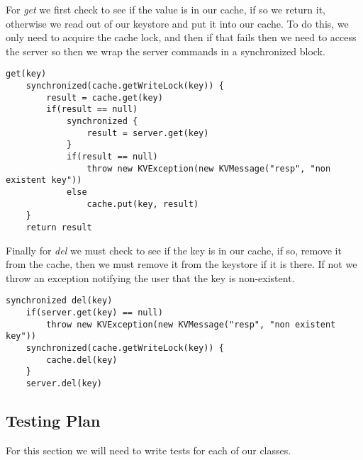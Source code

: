 \documentclass{article}
\begin{document}
For \textit{get} we first check to see if the value is in our cache, if so we return it, otherwise we read out of our
keystore and put it into our cache. To do this, we only need to acquire the cache lock, and then if that fails then we
need to access the server so then we wrap the server commands in a synchronized block.
\begin{verbatim}
get(key)
    synchronized(cache.getWriteLock(key)) {
        result = cache.get(key)
        if(result == null)
            synchronized {
                result = server.get(key)
            }
            if(result == null)
                throw new KVException(new KVMessage("resp", "non existent key"))
            else
                cache.put(key, result)
    }
    return result
\end{verbatim}

Finally for \textit{del} we must check to see if the key is in our cache, if so, remove it from the cache, then we must
remove it from the keystore if it is there. If not we throw an exception notifying the user that the key is
non-existent.
\begin{verbatim}
synchronized del(key)
    if(server.get(key) == null)
        throw new KVException(new KVMessage("resp", "non existent key"))
    synchronized(cache.getWriteLock(key)) {
        cache.del(key)
    }
    server.del(key)
\end{verbatim}

\subsection*{Testing Plan}

For this section we will need to write tests for each of our classes. 
\end{document}
